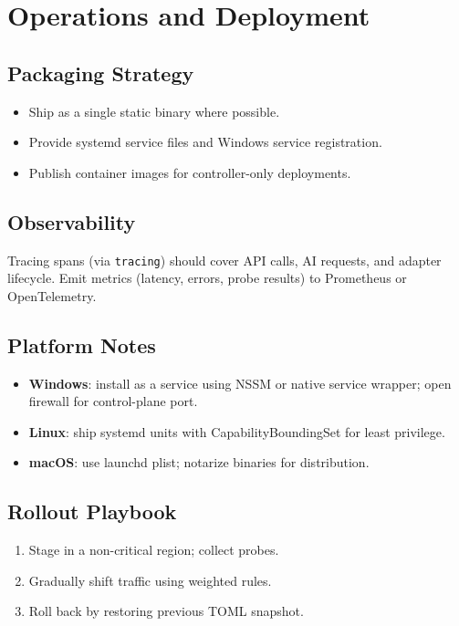 \chapter{Operations and Deployment}

\section{Packaging Strategy}
\begin{itemize}
    \item Ship as a single static binary where possible.
    \item Provide systemd service files and Windows service registration.
    \item Publish container images for controller-only deployments.
\end{itemize}

\section{Observability}
Tracing spans (via \texttt{tracing}) should cover API calls, AI requests, and adapter lifecycle. Emit metrics (latency, errors, probe results) to Prometheus or OpenTelemetry.

\section{Platform Notes}
\begin{itemize}
    \item \textbf{Windows}: install as a service using NSSM or native service wrapper; open firewall for control-plane port.
    \item \textbf{Linux}: ship systemd units with CapabilityBoundingSet for least privilege.
    \item \textbf{macOS}: use launchd plist; notarize binaries for distribution.
\end{itemize}

\section{Rollout Playbook}
\begin{enumerate}
    \item Stage in a non-critical region; collect probes.
    \item Gradually shift traffic using weighted rules.
    \item Roll back by restoring previous TOML snapshot.
\end{enumerate}

